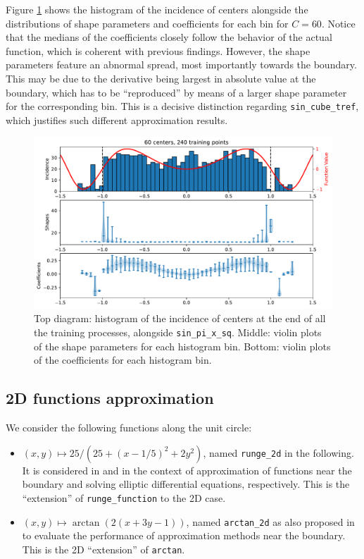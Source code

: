 \documentclass[12pt]{report} %
\begin{document}
Figure \ref{fig:triple-plot-sin-pi-x-sq-function} shows the histogram of the incidence of centers alongside the distributions of shape parameters and coefficients for each bin for $C=60$. Notice that the medians of the coefficients closely follow the behavior of the actual function, which is coherent with previous findings. However, the shape parameters feature an abnormal spread, most importantly towards the boundary. This may be due to the derivative being largest in absolute value at the boundary, which has to be ``reproduced'' by means of a larger shape parameter for the corresponding bin. This is a decisive distinction regarding \texttt{sin\_cube\_tref}, which justifies such different approximation results.

\begin{figure}
  \includegraphics[width=\textwidth]{imagenes/experiments/1d/statistical_1d_full_scheduler_interpolation/sin_pi_x_sq/C60-TR240-sin_pi_x_sq.pdf}
  \caption{Top diagram: histogram of the incidence of centers at the end of all the training processes, alongside \texttt{sin\_pi\_x\_sq}. Middle: violin plots of the shape parameters for each histogram bin. Bottom: violin plots of the coefficients for each histogram bin.}
  \label{fig:triple-plot-sin-pi-x-sq-function}
\end{figure}



\clearpage

\subsection*{2D functions approximation}

We consider the following functions along the unit circle:

\begin{itemize}
  \item $(x,y)\mapsto 25/(25+(x-1/5)^2+2y^2)$, named \texttt{runge\_2d} in the following. It is considered in \cite{fornberg2002observations} and \cite{larsson2003numerical} in the context of approximation of functions near the boundary and solving elliptic differential equations, respectively. This is the ``extension'' of \texttt{runge\_function} to the 2D case.
  \item  $(x,y)\mapsto \arctan(2(x+3y-1))$, named \texttt{arctan\_2d} as also proposed in \cite{fornberg2002observations} to evaluate the performance of approximation methods near the boundary. This is the 2D ``extension'' of \texttt{arctan}.
\end{itemize}
\end{document}
